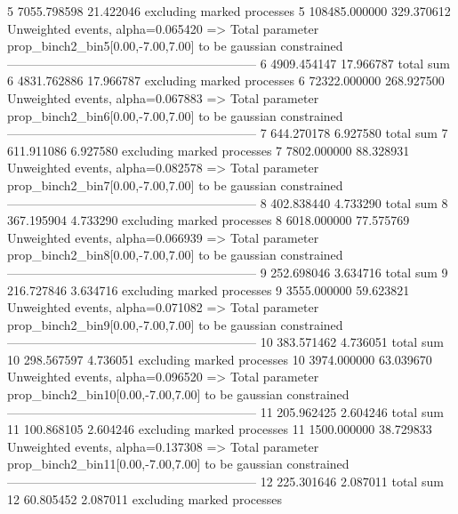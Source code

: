 5          7055.798598     21.422046       excluding marked processes    
5          108485.000000   329.370612      Unweighted events, alpha=0.065420
  => Total parameter prop_binch2_bin5[0.00,-7.00,7.00] to be gaussian constrained
------------------------------------------------------------
6          4909.454147     17.966787       total sum                     
6          4831.762886     17.966787       excluding marked processes    
6          72322.000000    268.927500      Unweighted events, alpha=0.067883
  => Total parameter prop_binch2_bin6[0.00,-7.00,7.00] to be gaussian constrained
------------------------------------------------------------
7          644.270178      6.927580        total sum                     
7          611.911086      6.927580        excluding marked processes    
7          7802.000000     88.328931       Unweighted events, alpha=0.082578
  => Total parameter prop_binch2_bin7[0.00,-7.00,7.00] to be gaussian constrained
------------------------------------------------------------
8          402.838440      4.733290        total sum                     
8          367.195904      4.733290        excluding marked processes    
8          6018.000000     77.575769       Unweighted events, alpha=0.066939
  => Total parameter prop_binch2_bin8[0.00,-7.00,7.00] to be gaussian constrained
------------------------------------------------------------
9          252.698046      3.634716        total sum                     
9          216.727846      3.634716        excluding marked processes    
9          3555.000000     59.623821       Unweighted events, alpha=0.071082
  => Total parameter prop_binch2_bin9[0.00,-7.00,7.00] to be gaussian constrained
------------------------------------------------------------
10         383.571462      4.736051        total sum                     
10         298.567597      4.736051        excluding marked processes    
10         3974.000000     63.039670       Unweighted events, alpha=0.096520
  => Total parameter prop_binch2_bin10[0.00,-7.00,7.00] to be gaussian constrained
------------------------------------------------------------
11         205.962425      2.604246        total sum                     
11         100.868105      2.604246        excluding marked processes    
11         1500.000000     38.729833       Unweighted events, alpha=0.137308
  => Total parameter prop_binch2_bin11[0.00,-7.00,7.00] to be gaussian constrained
------------------------------------------------------------
12         225.301646      2.087011        total sum                     
12         60.805452       2.087011        excluding marked processes    
